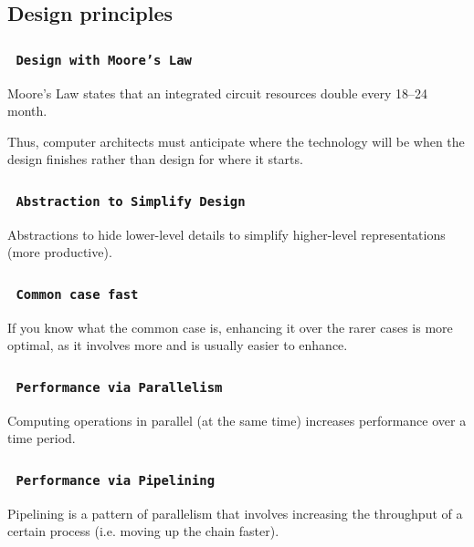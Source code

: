 \documentclass[11pt]{article}
\begin{document}
\subsection*{Design principles}

\subsubsection*{\rightarrow \ \texttt{Design with Moore's Law}}
\vspace{-0.5em}
Moore's Law states that an integrated circuit resources double every 18–24 month.

Thus, computer architects must anticipate where the technology will be when the design finishes rather than design for where it starts.

\subsubsection*{\rightarrow \ \texttt{Abstraction to Simplify Design}}
\vspace{-0.5em}
Abstractions to hide lower-level details to simplify higher-level representations (more productive).

\subsubsection*{\rightarrow \ \texttt{Common case fast}}
\vspace{-0.5em}

If you know what the common case is, enhancing it over the rarer cases is more optimal, as it involves more and is usually easier to enhance.

\subsubsection*{\rightarrow \ \texttt{Performance via Parallelism}}
\vspace{-0.5em}

Computing operations in parallel (at the same time) increases performance over a time period.

\subsubsection*{\rightarrow \ \texttt{Performance via Pipelining}}
\vspace{-0.5em}

Pipelining is a pattern of parallelism that involves increasing the throughput of a certain process (i.e. moving up the chain faster).
\end{document}
